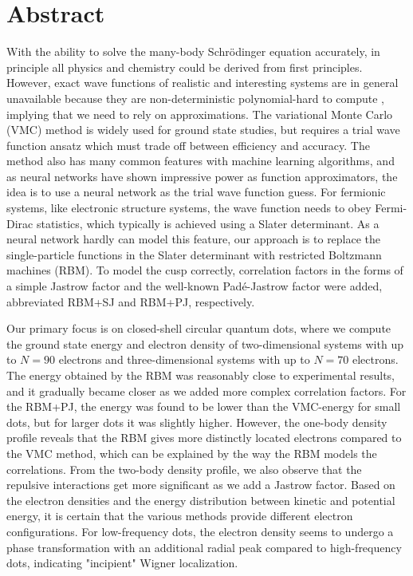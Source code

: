 \newpage
\section*{Abstract}
With the ability to solve the many-body Schrödinger equation accurately, in principle all physics and chemistry could be derived from first principles. However, exact wave functions of realistic and interesting systems are in general unavailable because they are non-deterministic polynomial-hard to compute \supercite{troyer_computational_2005}, implying that we need to rely on approximations. The variational Monte Carlo (VMC) method is widely used for ground state studies, but requires a trial wave function ansatz which must trade off between efficiency and accuracy. The method also has many common features with machine learning algorithms, and as neural networks have shown impressive power as function approximators, the idea is to use a neural network as the trial wave function guess. For fermionic systems, like electronic structure systems, the wave function needs to obey Fermi-Dirac statistics, which typically is achieved using a Slater determinant. As a neural network hardly can model this feature, our approach is to replace the single-particle functions in the Slater determinant with restricted Boltzmann machines (RBM). To model the cusp correctly, correlation factors in the forms of a simple Jastrow factor and the well-known Padé-Jastrow factor were added, abbreviated RBM+SJ and RBM+PJ, respectively.

Our primary focus is on closed-shell circular quantum dots, where we compute the ground state energy and electron density of two-dimensional systems with up to $N=90$ electrons and three-dimensional systems with up to $N=70$ electrons. The energy obtained by the RBM was reasonably close to experimental results, and it gradually became closer as we added more complex correlation factors. For the RBM+PJ, the energy was found to be lower than the VMC-energy for small dots, but for larger dots it was slightly higher. However, the one-body density profile reveals that the RBM gives more distinctly located electrons compared to the VMC method, which can be explained by the way the RBM models the correlations. From the two-body density profile, we also observe that the repulsive interactions get more significant as we add a Jastrow factor. Based on the electron densities and the energy distribution between kinetic and potential energy, it is certain that the various methods provide different electron configurations. For low-frequency dots, the electron density seems to undergo a phase transformation with an additional radial peak compared to high-frequency dots, indicating "incipient" Wigner localization.

